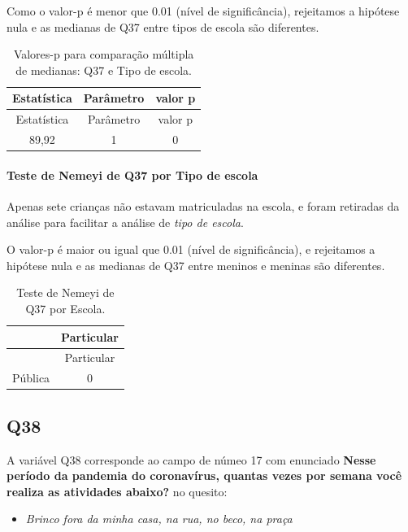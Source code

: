 \documentclass[]{article}
\providecommand{\tightlist}{%
  \setlength{\itemsep}{0pt}\setlength{\parskip}{0pt}}
\let\oldparagraph\paragraph
\renewcommand{\paragraph}[1]{\oldparagraph{#1}\mbox{}}
\begin{document}
Como o valor-p é menor que 0.01 (nível de significância), rejeitamos a hipótese nula e as medianas de Q37 entre tipos de escola são diferentes.

\begin{longtable}[]{@{}ccc@{}}
\caption{\label{tab:unnamed-chunk-1416}Valores-p para comparação múltipla de medianas: Q37 e Tipo de escola.}\tabularnewline
\toprule
Estatística & Parâmetro & valor p\tabularnewline
\midrule
\endfirsthead
\toprule
Estatística & Parâmetro & valor p\tabularnewline
\midrule
\endhead
89,92 & 1 & 0\tabularnewline
\bottomrule
\end{longtable}

\hypertarget{teste-de-nemeyi-de-q37-por-tipo-de-escola}{%
\paragraph{Teste de Nemeyi de Q37 por Tipo de escola}\label{teste-de-nemeyi-de-q37-por-tipo-de-escola}}

Apenas sete crianças não estavam matriculadas na escola, e foram retiradas da análise para facilitar a análise de \emph{tipo de escola}.

O valor-p é maior ou igual que 0.01 (nível de significância), e rejeitamos a hipótese nula e as medianas de Q37 entre meninos e meninas são diferentes.

\begin{longtable}[]{@{}lc@{}}
\caption{\label{tab:unnamed-chunk-1418}Teste de Nemeyi de Q37 por Escola.}\tabularnewline
\toprule
& Particular\tabularnewline
\midrule
\endfirsthead
\toprule
& Particular\tabularnewline
\midrule
\endhead
Pública & 0\tabularnewline
\bottomrule
\end{longtable}

\cleardoublepage

\hypertarget{q38}{%
\subsection{Q38}\label{q38}}

A variável Q38 corresponde ao campo de númeo 17 com enunciado \textbf{Nesse período da pandemia do coronavírus, quantas vezes por semana você realiza as atividades abaixo?} no quesito:

\begin{itemize}
\tightlist
\item
  \emph{Brinco fora da minha casa, na rua, no beco, na praça}
\end{itemize}
\end{document}
